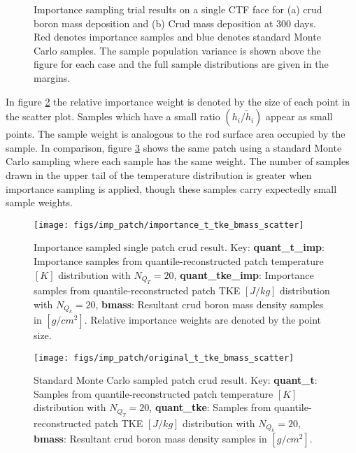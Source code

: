 \begin{figure}[H]%
    \centering
    \hspace*{-1.0em}%
    \caption[Importance sampling results.]{Importance sampling trial results on a single CTF face for (a) crud boron mass deposition and (b) Crud mass deposition at 300 days.  Red denotes importance samples and blue denotes standard Monte Carlo samples.  The sample population variance is shown above the figure for each case and the full sample distributions are given in the margins.}%
    \label{fig:imp_sample1}%
\end{figure}

In figure \ref{fig:importancettkebmassscatter} the relative importance weight is denoted by the size of each point in the scatter plot.  Samples which have a small ratio $(h_i/\tilde h_i)$ appear as small points.  The sample weight is analogous to the rod surface area occupied by the sample.  In comparison, figure \ref{fig:originalttkebmassscatter} shows the same patch using a standard Monte Carlo sampling where each sample has the same weight.  The number of samples drawn in the upper tail of the temperature distribution is greater when importance sampling is applied, though these samples carry expectedly small sample weights.

\begin{figure}[H]
    \centering
    \texttt{[image: figs/imp\_patch/importance\_t\_tke\_bmass\_scatter]}
    \caption[Importance sampled single patch crud scatter plot result.]{Importance sampled single patch crud result. Key: \textbf{quant\_t\_imp}: Importance samples from quantile-reconstructed patch temperature $[K]$ distribution with $N_{Q_T}=20$,  \textbf{quant\_tke\_imp}: Importance samples from quantile-reconstructed patch TKE $[J/kg]$ distribution with $N_{Q_k}=20$,  \textbf{bmass}:  Resultant crud boron mass density samples in $[g/cm^2]$. Relative importance weights are denoted by the point size.}
    \label{fig:importancettkebmassscatter}
\end{figure}

\begin{figure}[H]
    \centering
    \texttt{[image: figs/imp\_patch/original\_t\_tke\_bmass\_scatter]}
    \caption[Standard Monte Carlo sampled patch crud scatter plot result.]{Standard Monte Carlo sampled patch crud result. Key: \textbf{quant\_t}: Samples from quantile-reconstructed patch temperature $[K]$ distribution with $N_{Q_T}=20$,  \textbf{quant\_tke}: Samples from quantile-reconstructed patch TKE $[J/kg]$ distribution with $N_{Q_k}=20$,  \textbf{bmass}: Resultant crud boron mass density samples in $[g/cm^2]$.  }
    \label{fig:originalttkebmassscatter}
\end{figure}

